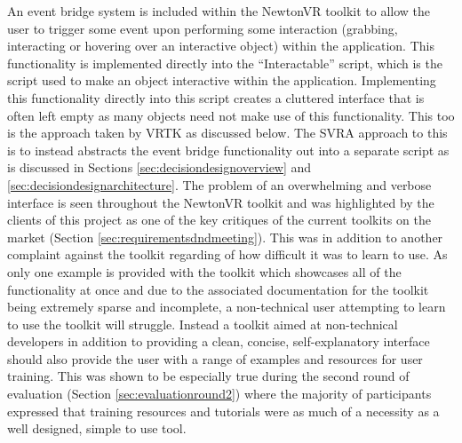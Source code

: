 \documentclass{l4proj}
\begin{document}
An event bridge system is included within the NewtonVR toolkit to allow the user to trigger some event upon performing some interaction (grabbing, interacting or hovering over an interactive object) within the application. This functionality is implemented directly into the ``Interactable'' script, which is the script used to make an object interactive within the application. Implementing this functionality directly into this script creates a cluttered interface that is often left empty as many objects need not make use of this functionality. This too is the approach taken by VRTK as discussed below. The SVRA approach to this is to instead abstracts the event bridge functionality out into a separate script as is discussed in Sections \ref{sec:decisiondesignoverview} and \ref{sec:decisiondesignarchitecture}. The problem of an overwhelming and verbose interface is seen throughout the NewtonVR toolkit and was highlighted by the clients of this project as one of the key critiques of the current toolkits on the market (Section \ref{sec:requirementsdndmeeting}). This was in addition to another complaint against the toolkit regarding of how difficult it was to learn to use. As only one example is provided with the toolkit which showcases all of the functionality at once and due to the associated documentation for the toolkit being extremely sparse and incomplete, a non-technical user attempting to learn to use the toolkit will struggle. Instead a toolkit aimed at non-technical developers in addition to providing a clean, concise, self-explanatory interface should also provide the user with a range of examples and resources for user training. This was shown to be especially true during the second round of evaluation (Section \ref{sec:evaluationround2}) where the majority of participants expressed that training resources and tutorials were as much of a necessity as a well designed, simple to use tool. 
\end{document}
